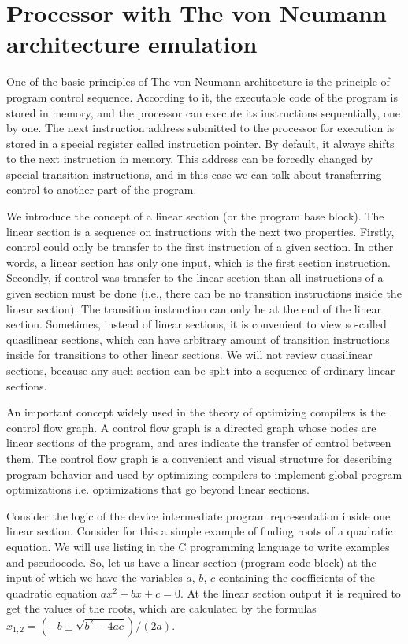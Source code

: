 \documentclass[
11pt,%
tightenlines,%
twoside,%
onecolumn,%
nofloats,%
nobibnotes,%
nofootinbib,%
superscriptaddress,%
noshowpacs,%
centertags]%
{revtex4}
\begin{document}
\section{Processor with The von Neumann architecture emulation}

One of the basic principles of The von Neumann architecture is the principle of program control sequence. According to it, the executable code of the program is stored in memory, and the processor can execute its instructions sequentially, one by one. The next instruction address submitted to the processor for execution is stored in a special register called instruction pointer. By default, it always shifts to the next instruction in memory. This address can be forcedly changed by special transition instructions, and in this case we can talk about transferring control to another part of the program.

We introduce the concept of a linear section (or the program base block). The linear section is a sequence on instructions with the next two properties. Firstly, control could only be transfer to the first instruction of a given section. In other words, a linear section has only one input, which is the first section instruction. Secondly, if control was transfer to the linear section than all instructions of a given section must be done (i.e., there can be no transition instructions inside the linear section). The transition instruction can only be at the end of the linear section. Sometimes, instead of linear sections, it is convenient to view so-called quasilinear sections, which can have arbitrary amount of transition instructions inside for transitions to other linear sections. We will not review quasilinear sections, because any such section can be split into a sequence of ordinary linear sections.

An important concept widely used in the theory of optimizing compilers is the control flow graph. A control flow graph is a directed graph whose nodes are linear sections of the program, and arcs indicate the transfer of control between them. The control flow graph is a convenient and visual structure for describing program behavior and used by optimizing compilers to implement global program optimizations i.e. optimizations that go beyond linear sections.

Consider the logic of the device intermediate program representation inside one linear section. Consider for this a simple example of finding roots of a quadratic equation. We will use listing in the C programming language to write examples and pseudocode. So, let us have a linear section (program code block) at the input of which we have the variables $a$, $b$, $c$ containing the coefficients of the quadratic equation $ax^2 + bx + c = 0$. At the linear section output it is required to get the values of the roots, which are calculated by the formulas $x_{1,2} = (-b \pm \sqrt{b^2 - 4ac})/(2a)$.
\end{document}
